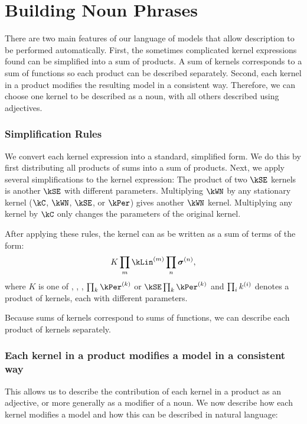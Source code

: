 \section{Building Noun Phrases}

There are two main features of our language of \gp{} models that allow description to be performed automatically.
First, the sometimes complicated kernel expressions found can be simplified into a sum of products.
A sum of kernels corresponds to a sum of functions so each product can be described separately.
Second, each kernel in a product modifies the resulting model in a consistent way.
Therefore, we can choose one kernel to be described as a noun, with all others described using adjectives.


\subsubsection{Simplification Rules}
We convert each kernel expression into a standard, simplified form.
We do this by first distributing all products of sums into a sum of products.
Next, we apply several simplifications to the kernel expression:
The product of two $\kSE$ kernels is another $\kSE$ with different parameters. Multiplying $\kWN$ by any stationary kernel ($\kC$, $\kWN$, $\kSE$, or $\kPer$) gives another $\kWN$ kernel. Multiplying any kernel by $\kC$ only changes the parameters of the original kernel.

After applying these rules, the kernel can as be written as a sum of terms of the form:
\begin{align}
K \prod_m \kLin^{(m)} \prod_n \boldsymbol\sigma^{(n)},
\label{eq:sop}
\end{align}
where $K$ is one of \kWN, \kC, \kSE, $\prod_k \kPer^{(k)}$ or $\kSE \prod_k \kPer^{(k)}$
and $\prod_ik^{(i)}$ denotes a product of kernels, each with different parameters.


Because sums of kernels correspond to sums of functions, we can describe each product of kernels separately.


\subsubsection{Each kernel in a product modifies a model in a consistent way}
This allows us to describe the contribution of each kernel in a product as an adjective, or more generally as a modifier of a noun.
We now describe how each kernel modifies a model and how this can be described in natural language:

